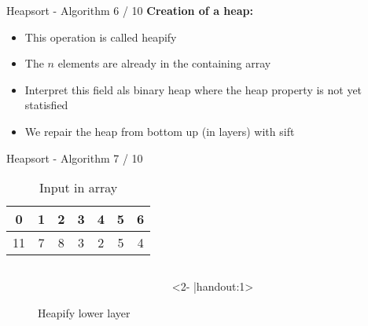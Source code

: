 
\begin{frame}{Heapsort - Algorithm 6 / 10}
  \textbf{Creation of a heap:}
  \begin{itemize}
    \item
      This operation is called {\color{MainA}heapify}
    \item<2- |handout:1>
      The {\color{MainA}$n$} elements are already in the containing array
    \item<3- |handout:1>
      Interpret this field als binary heap where the {\color{MainA}heap property} is not yet statisfied
    \item<4- |handout:1>
      We repair the heap from bottom up (in layers) with {\color{MainA}sift}
  \end{itemize}
\end{frame}


\begin{frame}{Heapsort - Algorithm 7 / 10}
  \vspace{-1.0em}
  \begin{table}[!h]%
    \caption{Input in array}%
    \label{tab:heapify_numbers}%
    \begin{tabular}{ccccccc}
      {\color{MainB}0}&
      {\color{MainB}1}&
      {\color{MainB}2}&
      {\color{MainB}3}&
      {\color{MainB}4}&
      {\color{MainB}5}&
      {\color{MainB}6}\\
      \hline
      \multicolumn{1}{|c}{11}&%
      \multicolumn{1}{|c}{7}&%
      \multicolumn{1}{|c}{8}&%
      \multicolumn{1}{|c}{3}&%
      \multicolumn{1}{|c}{2}&%
      \multicolumn{1}{|c}{5}&%
      \multicolumn{1}{|c|}{4}\\
      \hline
    \end{tabular}
  \end{table}
  \vspace*{-0.5em}
  \begin{centering}
    \begin{figure}[!h]%
      \begin{columns}%
        \begin{column}{0.425\textwidth}%
          \begin{adjustbox}{width=\linewidth}%
          \end{adjustbox}%
        \end{column}%
        \begin{column}{0.425\textwidth}<2- |handout:1>%
          \begin{adjustbox}{width=\linewidth}%
          \end{adjustbox}%
        \end{column}%
      \end{columns}%
      \caption{Heapify lower layer}%
      \label{fig:heapify_lower}%
    \end{figure}
  \end{centering}
\end{frame}

